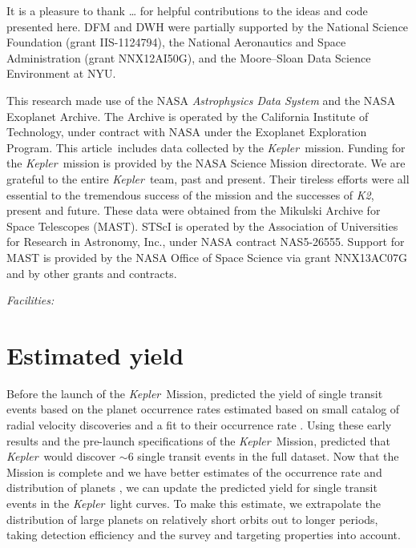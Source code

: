 \documentclass[12pt,preprint]{aastex}
\newcommand{\project}[1]{\textsl{#1}}
\newcommand{\kepler}{\project{Kepler}}
\newcommand{\KT}{\project{K2}}
\newcommand{\paper}{article}
\newcommand{\sectlabel}[1]{\label{sect:#1}}
\begin{document}
\acknowledgments
It is a pleasure to thank
\ldots
for helpful contributions to the ideas and code presented here.
DFM and DWH were partially supported by the National Science Foundation
(grant IIS-1124794),
the National Aeronautics and Space Administration
(grant NNX12AI50G), and the Moore--Sloan Data Science Environment at NYU.

This research made use of the NASA \project{Astrophysics Data System} and the
NASA Exoplanet Archive.
The Archive is operated by the California Institute of Technology, under
contract with NASA under the Exoplanet Exploration Program.
This \paper\ includes data collected by the \kepler\ mission. Funding for the
\kepler\ mission is provided by the NASA Science Mission directorate.
We are grateful to the entire \kepler\ team, past and present.
Their tireless efforts were all essential to the tremendous success of the mission
and the successes of \KT, present and future.
These data were obtained from the Mikulski Archive for Space Telescopes
(MAST).
STScI is operated by the Association of Universities for Research in
Astronomy, Inc., under NASA contract NAS5-26555.
Support for MAST is provided by the NASA Office of Space Science via grant
NNX13AC07G and by other grants and contracts.

{\it Facilities:} 

\appendix

\section{Estimated yield}\sectlabel{est}

Before the launch of the \kepler\ Mission, \citet{Yee:2008} predicted the
yield of single transit events based on the planet occurrence rates estimated
based on small catalog of radial velocity discoveries \citep{Butler:2006} and
a fit to their occurrence rate \citep{Cumming:2008}.
Using these early results and the pre-launch specifications of the \kepler\
Mission, \citet{Yee:2008} predicted that \kepler\ would discover $\sim 6$
single transit events in the full dataset.
Now that the Mission is complete and we have better estimates of the
occurrence rate and distribution of planets \citep[for example][]{Dong:2013,
Petigura:2013, Foreman-Mackey:2014, Dressing:2015}, we can update the
predicted yield for single transit events in the \kepler\ light curves.
To make this estimate, we extrapolate the distribution of large planets on
relatively short orbits out to longer periods, taking detection efficiency
and the survey and targeting properties into account.
\end{document}
